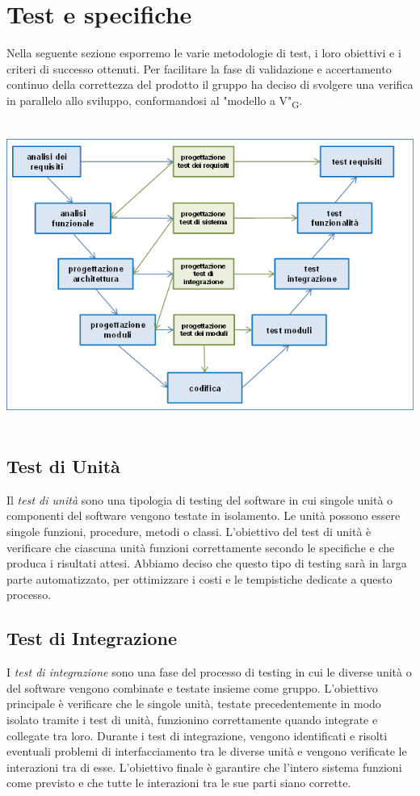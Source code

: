 \documentclass{article}
\begin{document}
{\section{Test e specifiche}
Nella seguente sezione esporremo le varie metodologie di test, i loro obiettivi e i criteri di successo ottenuti. Per facilitare la fase di validazione e accertamento continuo della correttezza del prodotto il gruppo ha deciso di svolgere una verifica in parallelo allo sviluppo, conformandosi al "modello a V"\textsubscript{G}.  
\begin{center}
\includegraphics[width=15cm, height=10cm]{documenti/modello_a_v.png}
\end{center}

\subsection{Test di Unità}
Il \textit{test di unità} sono una tipologia di testing del software in cui singole unità o componenti del software vengono testate in isolamento. Le unità possono essere singole funzioni, procedure, metodi o classi. L'obiettivo del test di unità è verificare che ciascuna unità funzioni correttamente secondo le specifiche e che produca i risultati attesi. Abbiamo deciso che questo tipo di testing sarà in larga parte automatizzato, per ottimizzare i costi e le tempistiche dedicate a questo processo.

\subsection{Test di Integrazione}
I \textit{test di integrazione} sono una fase del processo di testing in cui le diverse unità o del software vengono combinate e testate insieme come gruppo. L'obiettivo principale è verificare che le singole unità, testate precedentemente in modo isolato tramite i test di unità, funzionino correttamente quando integrate e collegate tra loro. Durante i test di integrazione, vengono identificati e risolti eventuali problemi di interfacciamento tra le diverse unità e vengono verificate le interazioni tra di esse. L'obiettivo finale è garantire che l'intero sistema funzioni come previsto e che tutte le interazioni tra le sue parti siano corrette.

}
\end{document}
